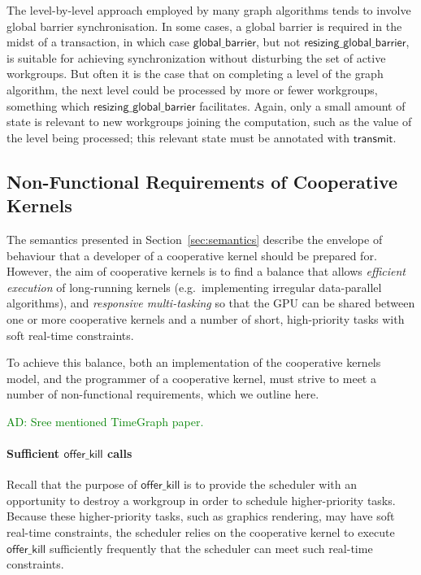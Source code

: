 \documentclass[nocopyrightspace,10pt]{sigplanconf}
\newcommand{\ADComment}[1]{\textcolor{green}{AD: #1}}
\newcommand{\transmit}{\mathsf{transmit}}
\newcommand{\offerkill}{\mathsf{offer\_kill}}
\newcommand{\globalbarrier}{\mathsf{global\_barrier}}
\newcommand{\resizingglobalbarrier}{\mathsf{resizing\_global\_barrier}}
\begin{document}
The level-by-level approach employed by many graph algorithms tends to
involve global barrier synchronisation.  In some cases, a global
barrier is required in the midst of a transaction, in which case
$\globalbarrier$, but not $\resizingglobalbarrier$, is suitable for
achieving synchronization without disturbing the set of active
workgroups.  But often it is the case that on completing a level of
the graph algorithm, the next level could be processed by more or
fewer workgroups, something which $\resizingglobalbarrier$
facilitates.  Again, only a small amount of state is relevant to new
workgroups joining the computation, such as the value of the level
being processed; this relevant state must be annotated with
$\transmit$.

\subsection{Non-Functional Requirements of Cooperative Kernels}\label{sec:nonfunctional}

The semantics presented in Section~\ref{sec:semantics} describe the envelope of
behaviour that a developer of a cooperative kernel should be prepared
for.
%
However, the aim of cooperative kernels is to find a balance that
allows \emph{efficient execution} of long-running kernels
(e.g.\ implementing irregular data-parallel algorithms), and
\emph{responsive multi-tasking} so that the GPU can be shared between
one or more cooperative kernels and a number of short, high-priority
tasks with soft real-time constraints.

To achieve this balance, both an implementation of the cooperative
kernels model, and the programmer of a cooperative kernel, must strive
to meet a number of non-functional requirements, which we outline
here.

\ADComment{Sree mentioned TimeGraph paper.}

\paragraph{Sufficient $\offerkill$ calls}

Recall that the purpose of $\offerkill$ is to provide the scheduler
with an opportunity to destroy a workgroup in order to schedule
higher-priority tasks.  Because these higher-priority tasks, such as
graphics rendering, may have soft real-time constraints, the scheduler
relies on the cooperative kernel to execute $\offerkill$ sufficiently
frequently that the scheduler can meet such real-time constraints.
\end{document}
